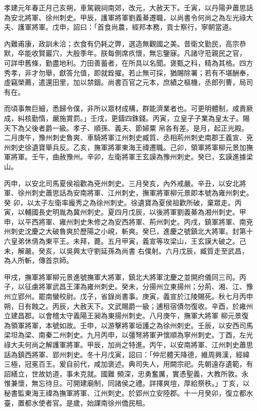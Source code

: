 \begin{pinyinscope}
 孝建元年春正月己亥朔，車駕親祠南郊，改元，大赦天下。壬寅，以丹陽尹蕭思話為安北將軍、徐州刺史。甲辰，護軍將軍劉義綦遷職，以尚書令何尚之為左光祿大夫、護軍將軍。戊申，詔曰：「首食尚農，經邦本務，貢士察行，寧朝當道。



 內難甫康，政訓未洽；衣食有仍耗之弊，選造無觀國之美。昔衛文勤民，高宗恭默，卒能收賢巖穴，大殷季年。朕每側席疚懷，無忘鑒寐。凡諸守蒞親民之官，
 可詳申舊條，勤盡地利。力田善蓄者，在所具以名聞。褒甄之科，精為其格。四方秀孝，非才勿舉，獻答允值，即就銓擢。若止無可採，猶賜除署；若有不堪酬奉，虛竊榮薦，遣還田里，加以禁錮。尚書百官之元本，庶績之樞機，丞郎列曹，局司有在。



 而頃事無巨細，悉歸令僕，非所以眾材成構，群能濟業者也。可更明體制，咸責厥成，糾核勤惰，嚴施賞罰。」壬戌，更鑄四銖錢。丙寅，立皇子子業為皇太子。賜天下為父後者爵一級。孝子、順孫、義夫、節婦粟
 帛各有差。是月，起正光殿。二月庚午，豫州刺史魯爽、車騎將軍江州刺史臧質、丞相荊州刺史南郡王義宣、兗州刺史徐遺寶舉兵反。乙亥，撫軍將軍東海王禕遷職。己卯，領軍將軍柳元景加撫軍將軍。壬午，曲赦豫州。辛卯，左衛將軍王玄謨為豫州刺史。癸巳，玄謨進據梁山。



 丙申，以安北司馬夏侯祖歡為兗州刺史。三月癸亥，內外戒嚴。辛丑，以安北將軍、徐州刺史蕭思話為安南將軍、江州刺史，撫軍將軍柳元景即本號為雍州刺史。癸
 卯，以太子左衛率龐秀之為徐州刺史。徐遺寶為夏侯祖歡所破，棄眾走。丙寅，以輔國長史明胤為冀州刺史。夏四月戊辰，以後將軍劉義綦為湘州刺史。甲申，以平西將軍、雍州刺史朱修之為安西將軍、荊州刺史。丙戌，鎮軍將軍、南兗州刺史沈慶之大破魯爽於歷陽之小峴，斬爽。癸巳，進慶之號鎮北大將軍。封第十六皇弟休倩為東平王。未拜，薨。五月甲寅，義宣等攻梁山，王玄謨大破之。己未，解嚴。癸亥，以吳興太守劉延孫為尚書
 右僕射。六月戊辰，臧質走至武昌，為人所斬，傳首京師。



 甲戌，撫軍將軍柳元景進號撫軍大將軍，鎮北大將軍沈慶之並開府儀同三司。丙子，以征虜將軍武昌王渾為雍州刺史。癸未，分揚州立東揚州；分荊、湘、江、豫州立郢州。罷南蠻校尉。戊子，省錄尚書事。庚寅，義宣於江陵賜死。秋七月丙申朔，日有蝕之。丙辰，大赦天下。文武賜爵一級；逋租宿債勿復收。辛酉，於雍州立建昌郡。以會稽太守義陽王昶為東揚州刺史。八月庚午，撫軍大將軍
 柳元景復為領軍將軍，本號如故。壬申，以游擊將軍垣護之為徐州刺史。壬辰，以安西司馬梁坦為梁、南秦二州刺史。九月丙申，以彊弩將軍尹懷順為寧州刺史。丁酉，左光祿大夫何尚之解護軍將軍。甲辰，加尚之特進。丙午，以安南將軍、江州刺史蕭思話為鎮西將軍、郢州刺史。冬十月戊寅，詔曰：「仲尼體天降德，維周興漢，經緯三極，冠冕百王。爰自前代，咸加褒述。典司失人，用闕宗祀。先朝遠存遺範，有詔繕立，世故妨道，事未克就。國難
 頻深，忠勇奮厲，實憑聖義，大教所敦。永惟兼懷，無忘待旦。可開建廟制，同諸侯之禮。詳擇爽塏，厚給祭秩。」丁亥，以秘書監東海王禕為撫軍將軍、江州刺史。於郢州立安陸郡。十一月癸卯，復立都水臺，置都水使者官。是歲，始課南徐州僑民租。




\end{pinyinscope}
